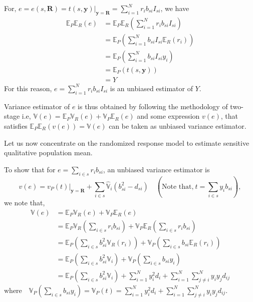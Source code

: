 \documentclass[12pt]{article}
\newcommand{\E}{\mathbb{E}}
\newcommand{\Var}{\mathbb{V}}
\theoremstyle{definition}
\newenvironment{note}{
\begin{tcolorbox}[colback=blue!5!white,colframe=blue!75!black,title=Note, parbox = false] }{\end{tcolorbox} }
\begin{document}
\begin{note}
For, $e = e(s,\mathbf{R})=\left.t(s,\mathbf{y})\right|_{\mathbf{y}=\mathbf{R}}=\displaystyle\sum_{i=1}^N r_ib_{si}I_{si}$, we have
\begin{align*}
    \E_P\E_R(e) & = \E_P\E_R\left(\sum_{i=1}^N r_ib_{si}I_{si}\right)\\
    & = \E_P\left(\sum_{i=1}^N b_{si}I_{si}\E_R(r_i)\right)\\
    & = \E_P\left(\sum_{i=1}^N b_{si}I_{si}y_i\right)\\
    & = \E_P(t(s,\mathbf{y}))\\
    & = Y
\end{align*}
For this reason, $e=\displaystyle\sum_{i=1}^N r_ib_{si}I_{si}$ is an unbiased estimator of $Y$.

Variance estimator of $e$ is thus obtained by following the methodology of two-stage i.e, $\Var(e)=\E_P\Var_R(e)+\Var_P\E_R(e)$ and some expression  $v(e)$, that satisfies $\E_P\E_R(v(e))=\Var(e)$ can be taken as unbiased variance estimator.
\end{note}

Let us now concentrate on the randomized response model to estimate sensitive qualitative population mean.

To show that for $e=\displaystyle\sum_{i\in s} r_ib_{si}$, an unbiased variance estimator is
$$v(e)=\left.v_P(t)\right|_{\mathbf{y}=\mathbf{R}}+\sum_{i\in s} \hat{\Var}_i (b_{si}^2-d_{si})\quad \left(\text{Note that,}\  t=\sum_{i\in s} y_ib_{si}\right),$$
we note that,
\begin{align*}
    \Var(e) & = \E_P\Var_R(e)+\Var_P\E_R(e)\\ 
    & = \E_P\Var_R\left(\displaystyle\sum_{i\in s} r_ib_{si}\right)+\Var_P\E_R\left(\displaystyle\sum_{i\in s} r_ib_{si}\right)\\
    & = \E_P\left(  \displaystyle\sum_{i\in s} b_{si}^2 \Var_R(r_i) \right) + \Var_P\left(\sum_{i\in s} b_{si}\E_R(r_i)\right)\\
    & = \E_P\left(  \displaystyle\sum_{i\in s} b_{si}^2 \Var_i \right) + \Var_P\left(\sum_{i\in s} b_{si}y_i\right)\\
    & = \E_P\left(  \displaystyle\sum_{i\in s} b_{si}^2 \Var_i \right) +\sum_{i=1}^N y_i^2d_i +\displaystyle \sum_{i=1}^N \sum_{j\neq i}^N y_iy_jd_{ij}
\end{align*}
$\text{where}\quad \Var_P\left(\displaystyle\sum_{i\in s} b_{si}y_i\right)=\Var_P(t)=\displaystyle\sum_{i=1}^N y_i^2d_i +\displaystyle \sum_{i=1}^N \sum_{j\neq i}^N y_iy_jd_{ij}$.
\end{document}
